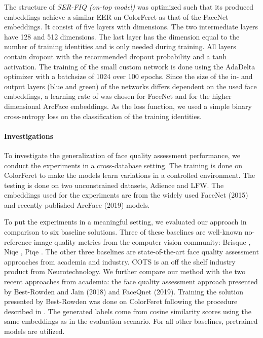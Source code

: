 \documentclass[10pt,twocolumn,letterpaper]{article}
\begin{document}
The structure of \textit{SER-FIQ (on-top model)} was optimized such that its produced embeddings achieve a similar EER on ColorFeret as that of the FaceNet embeddings.
It consist of five layers with  dimensions.
The two intermediate layers have 128 and 512 dimensions.
The last layer has the dimension equal to the number of training identities  and is only needed during training.
All layers contain dropout \cite{Srivastava:2014:DSW:2627435.2670313} with the recommended dropout probability  and a tanh activation.
The training of the small custom network is done using the AdaDelta optimizer \cite{DBLP:journals/corr/abs-1212-5701} with a batchsize of 1024 over 100 epochs.
Since the size of the in- and output layers (blue and green) of the networks differs dependent on the used face embeddings, a learning rate of  was chosen for FaceNet and  for the higher dimensional ArcFace embeddings.
As the loss function, we used a simple binary cross-entropy loss on the classification of the training identities.







\paragraph{Investigations}
To investigate the generalization of face quality assessment performance, we conduct the experiments in a cross-database setting.
The training is done on ColorFeret to make the models learn variations in a controlled environment.
The testing is done on two unconstrained datasets, Adience and LFW.
The embeddings used for the experiments are from the widely used FaceNet (2015) and recently published ArcFace (2019) models.


To put the experiments in a meaningful setting, we evaluated our approach in comparison to six baseline solutions.
Three of these baselines are well-known no-reference image quality metrics from the computer vision community: Brisque \cite{6272356}, Niqe \cite{6353522}, Piqe \cite{7084843}.
The other three baselines are state-of-the-art face quality assessment approaches from academia and industry.
COTS \cite{COTS} is an off the shelf industry product from Neurotechnology.
We further compare our method with the two recent approaches from academia:
the face quality assessment approach presented by Best-Rowden and Jain \cite{DBLP:journals/corr/Best-RowdenJ17} (2018) and FaceQnet \cite{DBLP:journals/corr/abs-1904-01740} (2019).
Training the solution presented by Best-Rowden was done on ColorFeret following the procedure described in \cite{DBLP:journals/corr/Best-RowdenJ17}.
The generated labels come from cosine similarity scores using the same embeddings as in the evaluation scenario.
For all other baselines, pretrained models are utilized.
\end{document}
